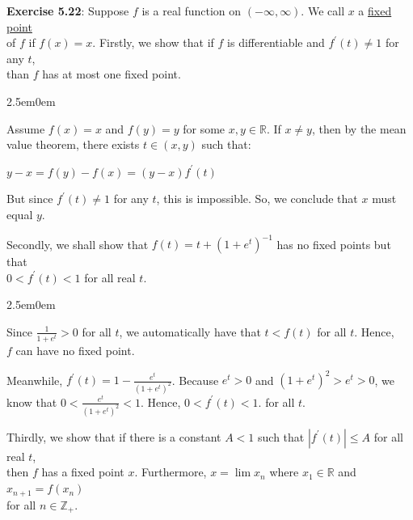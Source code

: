 \documentclass{book}
\newcommand{\pracTwo}{
   \color{Orange}%
   \fontsize{12}{14}\selectfont%
}
\newenvironment{myIndent}{%
   \begin{adjustwidth}{2.5em}{0em}%
}{%
   \end{adjustwidth}%
}
\newcommand{\retTwo}{\hfill\bigbreak}
\begin{document}
\newpage

\textbf{Exercise 5.22}: Suppose $f$ is a real function on $(-\infty, \infty)$. We call $x$ a \ul{fixed point}\\ of $f$ if $f(x) = x$. Firstly, we show that if $f$ is differentiable and $f^\prime(t) \neq 1$ for any $t$,\\ than $f$ has at most one fixed point.\\ [-6pt]

{\begin{myIndent}\pracTwo
   Assume $f(x) = x$ and $f(y) = y$ for some $x, y \in \mathbb{R}$. If $x \neq y$, then by the mean\\ value theorem, there exists $t \in (x, y)$ such that:

   {\centering $y-x = f(y) - f(x) = (y-x)f^\prime(t)$\retTwo\par}

   But since $f^\prime(t) \neq 1$ for any $t$, this is impossible. So, we conclude that $x$ must\\ equal $y$.\retTwo
\end{myIndent}}

Secondly, we shall show that $f(t) = t + (1+e^t)^{-1}$ has no fixed points but that\\ $0 < f^\prime(t) < 1$ for all real $t$.\\ [-6pt]

{\begin{myIndent}\pracTwo
   Since $\frac{1}{1+e^t} > 0$ for all $t$, we automatically have that $t < f(t)$ for all $t$. Hence,\\ $f$ can have no fixed point.\retTwo

   Meanwhile, $f^\prime(t) = 1 - \frac{e^t}{\left(1 + e^t\right)^2}$. Because $e^t > 0$ and $(1 + e^t)^2 > e^t > 0$, we\\ know that $0 < \frac{e^t}{\left(1+e^t\right)^2} < 1$. Hence, $0 < f^\prime(t) < 1$. for all $t$.
   \retTwo
\end{myIndent}}

Thirdly, we show that if there is a constant $A < 1$ such that $|f^\prime(t)| \leq A$ for all real $t$,\\ then $f$ has a fixed point $x$. Furthermore, $x = \lim{x_n}$ where $x_1 \in \mathbb{R}$ and $x_{n+1} = f(x_n)$\\ for all $n \in \mathbb{Z}_+$. \\ [-6pt]
\end{document}
